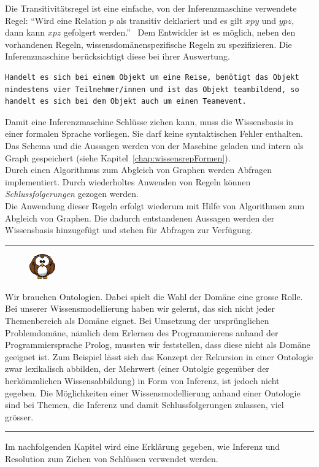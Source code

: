 Die Transitivitätsregel ist eine einfache, von der Inferenzmaschine verwendete Regel: ``Wird eine Relation $p$ als transitiv deklariert und es gilt $x p y$ und $y p z$, dann kann $x p z$ gefolgert werden.''~\cite[S. 289]{IspekOntoBedeutung}
Dem Entwickler ist es möglich, neben den vorhandenen Regeln, wissensdomänenspezifische Regeln zu spezifizieren. Die Inferenzmaschine berücksichtigt diese bei ihrer Auswertung.

\begin{lstlisting}[caption={Beispiel einer Regel in einer Wissensbasis.}]
Handelt es sich bei einem Objekt um eine Reise, benötigt das Objekt mindestens vier Teilnehmer/innen und ist das Objekt teambildend, so handelt es sich bei dem Objekt auch um einen Teamevent.
\end{lstlisting}

Damit eine Inferenzmaschine Schlüsse ziehen kann, muss die Wissensbasis in einer formalen Sprache vorliegen. Sie darf keine syntaktischen Fehler enthalten. Das Schema und die Aussagen werden von der Maschine geladen und intern als Graph gespeichert (siehe Kapitel~\ref{chap:wissensrepFormen}).\\
Durch einen Algorithmus zum Abgleich von Graphen werden Abfragen implementiert. Durch wiederholtes Anwenden von Regeln können \textit{Schlussfolgerungen} gezogen werden.\\ Die Anwendung dieser Regeln erfolgt wiederum mit Hilfe von Algorithmen zum Abgleich von Graphen. Die dadurch entstandenen Aussagen werden der Wissensbasis hinzugefügt und stehen für Abfragen zur Verfügung.

\noindent\rule[1ex]{\textwidth}{1pt}
\begin{figure}
    \vspace{-14pt}
    \includegraphics[width=0.1\textwidth]{bilder/owl.png}
\end{figure}
Wir brauchen Ontologien. Dabei spielt die Wahl der Domäne eine grosse Rolle. Bei unserer Wissensmodellierung haben wir gelernt, das sich nicht jeder Themenbereich als Domäne eignet.
Bei Umsetzung der ursprünglichen Problemdomäne, nämlich dem Erlernen des Programmierens anhand der Programmiersprache Prolog, mussten wir feststellen, dass diese nicht als Domäne geeignet ist. Zum Beispiel lässt sich das Konzept der Rekursion in einer Ontologie zwar lexikalisch abbilden, der Mehrwert (einer Ontolgie gegenüber der herkömmlichen Wissensabbildung) in Form von Inferenz, ist jedoch nicht gegeben. Die Möglichkeiten einer Wissensmodellierung anhand einer Ontologie sind bei Themen, die Inferenz und damit Schlussfolgerungen zulassen, viel grösser.
\noindent\rule[1ex]{\textwidth}{1pt}

Im nachfolgenden Kapitel wird eine Erklärung gegeben, wie Inferenz und Resolution zum Ziehen von Schlüssen verwendet werden.
